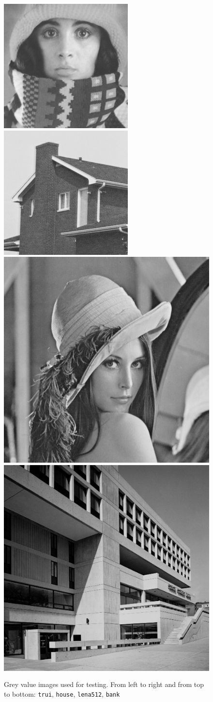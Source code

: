 \begin{figure}[ht]
    \includegraphics[width=0.5\linewidth]{../../images/grey/trui.png}
    \includegraphics[width=0.5\linewidth]{../../images/grey/house.png}
    \includegraphics[width=0.5\linewidth]{../../images/grey/lena512.png}
    \includegraphics[width=0.5\linewidth]{../../images/grey/bank.png}
    \caption{Grey value images used for testing. From left to right and from top to bottom: \texttt{trui},
    \texttt{house}, \texttt{lena512}, \texttt{bank}}\label{fig:GreyValueImg}
\end{figure}
